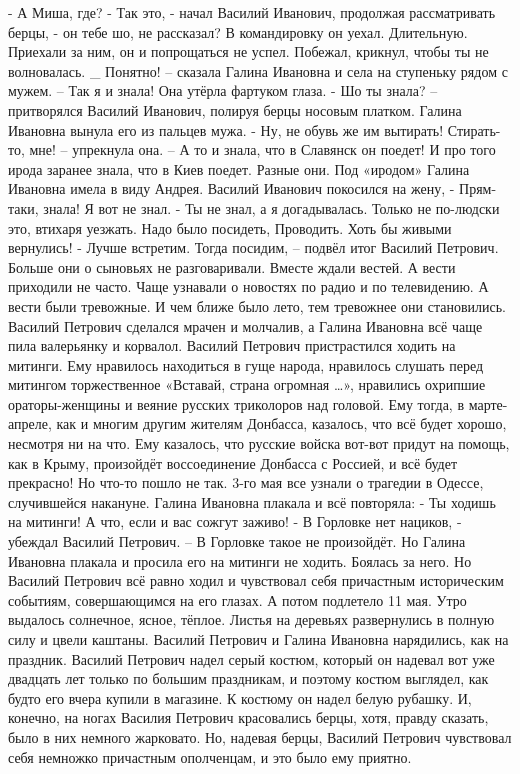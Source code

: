 - А Миша, где?
- Так это, - начал Василий Иванович, продолжая рассматривать берцы, - он тебе шо, не рассказал? В командировку он уехал. Длительную. Приехали за ним, он и попрощаться не успел. Побежал, крикнул, чтобы ты не волновалась.
_ Понятно! – сказала Галина Ивановна и села на ступеньку рядом с мужем. – Так я и знала!
Она утёрла фартуком глаза.
- Шо ты знала? – притворялся Василий Иванович, полируя берцы носовым платком. Галина Ивановна вынула его из пальцев мужа.
- Ну, не обувь же им вытирать! Стирать-то, мне! – упрекнула она. – А то и знала, что в Славянск он поедет! И про того ирода заранее знала, что в Киев поедет. Разные они.
Под «иродом» Галина Ивановна имела в виду Андрея.
Василий Иванович покосился на жену,
- Прям-таки, знала! Я вот не знал.
- Ты не знал, а я догадывалась. Только не по-людски это, втихаря уезжать. Надо было посидеть, Проводить. Хоть бы живыми вернулись!
- Лучше встретим. Тогда посидим, – подвёл итог Василий Петрович.
Больше они о сыновьях не разговаривали. Вместе ждали вестей. А вести приходили не часто. Чаще узнавали о новостях по радио и по телевидению. А вести были тревожные. И чем ближе было лето, тем тревожнее они становились. Василий Петрович сделался мрачен и молчалив, а Галина Ивановна всё чаще пила валерьянку и корвалол.
Василий Петрович пристрастился ходить на митинги. Ему нравилось находиться в гуще народа, нравилось слушать перед митингом торжественное «Вставай, страна огромная …», нравились охрипшие ораторы-женщины и веяние русских триколоров над головой. Ему тогда, в марте-апреле, как и многим другим жителям Донбасса, казалось, что всё будет хорошо, несмотря ни на что. Ему казалось, что русские войска вот-вот придут на помощь, как в Крыму, произойдёт воссоединение Донбасса с Россией, и всё будет прекрасно!
Но что-то пошло не так. 3-го мая все узнали о трагедии в Одессе, случившейся накануне.
Галина Ивановна плакала и всё повторяла: - Ты ходишь на митинги! А что, если и вас сожгут заживо!
- В Горловке нет нациков, - убеждал Василий Петрович. – В Горловке такое не произойдёт.
Но Галина Ивановна плакала и просила его на митинги не ходить. Боялась за него. Но Василий Петрович всё равно ходил и чувствовал себя причастным историческим событиям, совершающимся на его глазах.
А потом подлетело 11 мая. Утро выдалось солнечное, ясное, тёплое. Листья на деревьях развернулись в полную силу и цвели каштаны.
Василий Петрович и Галина Ивановна нарядились, как на праздник. Василий Петрович надел серый костюм, который он надевал вот уже двадцать лет только по большим праздникам, и поэтому костюм выглядел, как будто его вчера купили в магазине. К костюму он надел белую рубашку. И, конечно, на ногах Василия Петрович красовались берцы, хотя, правду сказать, было в них немного жарковато. Но, надевая берцы, Василий Петрович чувствовал себя немножко причастным ополченцам, и это было ему приятно.

